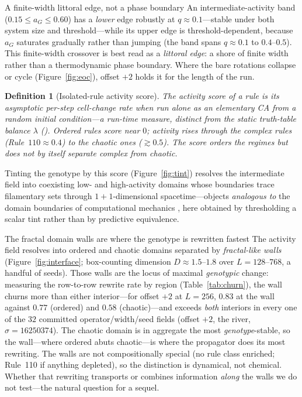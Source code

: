 \documentclass[man,12pt,floatsintext]{apa7}
\newcommand{\secref}[1]{\emph{\nameref{#1}}}
\newtheorem{definition}{Definition}
\begin{document}
\begin{empiricalfinding}[label={find:littoral}]{A finite-width littoral edge, not a phase boundary}
An intermediate-activity band ($0.15 \le a_G \le 0.60$) has a \emph{lower} edge
robustly at $q \approx 0.1$---stable under both system size and threshold---while
its upper edge is threshold-dependent, because $a_G$ saturates gradually rather
than jumping (the band spans $q \approx 0.1$ to $0.4$--$0.5$). This finite-width
crossover is best read as a \emph{littoral edge}: a shore of finite width rather
than a thermodynamic phase boundary. Where the bare rotations collapse or cycle
(Figure~\ref{fig:eoc}), offset $+2$ holds it for the length of the run.
\end{empiricalfinding}

\begin{definition}[Isolated-rule activity score]\label{def:activity}
The \emph{activity score} of a rule is its asymptotic per-step cell-change rate
when run alone as an elementary CA from a random initial condition---a run-time
measure, distinct from the static truth-table balance $\lambda$
(\secref{sec:lambda}). Ordered rules score near $0$; activity rises through the
complex rules (Rule~$110 \approx 0.4$) to the chaotic ones ($\gtrsim 0.5$). The
score \emph{orders} the regimes but does not by itself separate complex from
chaotic.
\end{definition}

Tinting the genotype by this score (Figure~\ref{fig:tint}) resolves the
intermediate field into coexisting low- and high-activity domains whose
boundaries trace filamentary sets through $1{+}1$-dimensional spacetime---objects
\emph{analogous to} the domain boundaries of computational mechanics
\parencite{crutchfield1989inferring,shalizi2001computational}, here obtained by
thresholding a scalar tint rather than by predictive equivalence.

\begin{empiricalfinding}[label={find:walls}]{The fractal domain walls are where the genotype is rewritten fastest}
The activity field resolves into ordered and chaotic domains separated by
\emph{fractal-like walls} (Figure~\ref{fig:interface}; box-counting dimension
$D \approx 1.5$--$1.8$ over $L = 128$--$768$, a handful of seeds). Those walls are
the locus of maximal \emph{genotypic} change: measuring the row-to-row rewrite
rate by region (Table~\ref{tab:churn}), the wall churns more than either
interior---for offset $+2$ at $L = 256$, $0.83$ at the wall against $0.77$
(ordered) and $0.58$ (chaotic)---and exceeds \emph{both} interiors in every one of
the $32$ committed operator/width/seed fields (offset $+2$, the river, $\sigma =
16250374$). The chaotic domain is in aggregate the most \emph{genotype}-stable, so
the wall---where ordered abuts chaotic---is where the propagator does its most
rewriting. The walls are not compositionally special (no rule class enriched;
Rule~110 if anything depleted), so the distinction is dynamical, not chemical.
Whether that rewriting transports or combines information \emph{along} the walls
we do not test---the natural question for a sequel.
\end{empiricalfinding}
\end{document}

